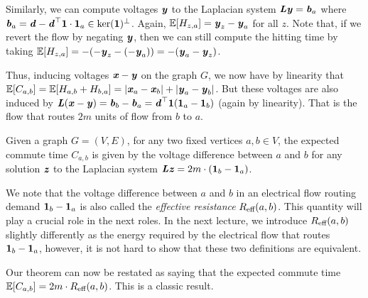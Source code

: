 Similarly, we can compute voltages $\boldsymbol{\mathit{y}}$ to the Laplacian system $\boldsymbol{\mathit{L}} \boldsymbol{\mathit{y}} = \boldsymbol{\mathit{b}}_a$ where $\boldsymbol{\mathit{b}}_a = \boldsymbol{\mathit{d}} - \boldsymbol{\mathit{d}}^\top \boldsymbol{1} \cdot \boldsymbol{1}_a \in \ker(\boldsymbol{1})^\perp$. Again, $\mathbb{E}[H_{z,a}] = \boldsymbol{\mathit{y}}_z - \boldsymbol{\mathit{y}}_a$ for all $z$. Note that, if we revert the flow by negating $\boldsymbol{\mathit{y}}$, then we can still compute the hitting time by taking $\mathbb{E}[H_{z,a}] = -(-\boldsymbol{\mathit{y}}_z - (-\boldsymbol{\mathit{y}}_a)) = -(\boldsymbol{\mathit{y}}_a-\boldsymbol{\mathit{y}}_z)$.

Thus, inducing voltages $\boldsymbol{\mathit{x}} - \boldsymbol{\mathit{y}}$ on the graph $G$, we now have by linearity that $\mathbb{E}[C_{a,b}] = \mathbb{E}[H_{a,b}+H_{b,a}] = |\boldsymbol{\mathit{x}}_a - \boldsymbol{\mathit{x}}_b| + |\boldsymbol{\mathit{y}}_a-\boldsymbol{\mathit{y}}_b|$. But these voltages are also induced by $\boldsymbol{\mathit{L}} (\boldsymbol{\mathit{x}} - \boldsymbol{\mathit{y}}) = \boldsymbol{\mathit{b}}_b - \boldsymbol{\mathit{b}}_a = \boldsymbol{\mathit{d}}^\top \boldsymbol{1} (\boldsymbol{1}_a - \boldsymbol{1}_b)$ (again by linearity). That is the flow that routes $2m$ units of flow from $b$ to $a$.  

\begin{theorem}
	Given a graph $G=(V,E)$, for any two fixed vertices $a,b \in V$, the expected commute time $C_{a,b}$ is given by the voltage difference between $a$ and $b$ for any solution $\boldsymbol{\mathit{z}}$ to the Laplacian system $\boldsymbol{\mathit{L}} \boldsymbol{\mathit{z}} = 2m \cdot (\boldsymbol{1}_b - \boldsymbol{1}_a)$.
\end{theorem}

We note that the voltage difference between $a$ and $b$ in an electrical flow routing demand $\boldsymbol{1}_b - \boldsymbol{1}_a$ is also called the \emph{effective resistance} $R_{\text{eff}}(a,b)$. This quantity will play a crucial role in the next roles. In the next lecture, we introduce $R_{\text{eff}}(a,b)$ slightly differently as the energy required by the electrical flow that routes $\boldsymbol{1}_b - \boldsymbol{1}_a$, however, it is not hard to show that these two definitions are equivalent.

Our theorem can now be restated as saying that the expected commute time $\mathbb{E}[C_{a,b}] = 2m \cdot R_{\text{eff}}(a,b)$. This is a classic result.